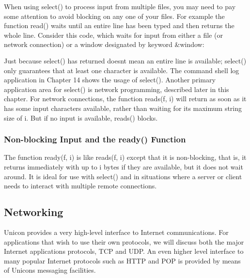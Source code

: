 When using \textsf{select()} to process input from multiple files, you
may need to pay some attention to avoid blocking on any one of your
files. For example the function \textsf{read()} waits until an entire
line has been typed and then returns the whole line. Consider this
code, which waits for input from either a file (or network connection)
or a window designated by keyword \textsf{\&window}:


Just because \textsf{select()} has returned doesn{\textquotesingle}t
mean an entire line is available; \textsf{select()} only guarantees
that at least one character is available. The command shell log
application in Chapter 14 shows the usage of \textsf{select()}. Another
primary application area for \textsf{select()} is network programming,
described later in this chapter. For network connections, the function
\textsf{reads(f, i)} will return as soon as it has some input
characters available, rather than waiting for its maximum string size
of \textsf{i}. But if no input is available, reads() blocks.

\subsubsection[Non{}-blocking Input and the ready()
Function]{Non-blocking Input and the \textrm{ready()} Function}
The function \textsf{ready(f, i)} is like \textsf{reads(f, i)} except
that it is non-blocking, that is, it returns immediately with up to
\textsf{i} bytes if they are available, but it does not wait around. It
is ideal for use with \textsf{select()} and in situations where a
server or client needs to interact with multiple remote connections.

\subsection[Networking]{Networking}
Unicon provides a very high-level interface to
Internet communications. For applications that wish to
use their own protocols, we will discuss both the major Internet
applications protocols, TCP and UDP. An even higher level
interface to many popular Internet protocols such as HTTP and POP is
provided by means of Unicon{\textquotesingle}s messaging facilities.

